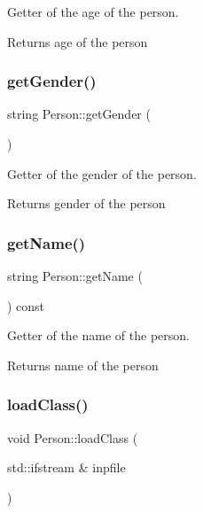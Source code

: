 Getter of the age of the person. 

\begin{DoxyReturn}{Returns}
age of the person 
\end{DoxyReturn}
\mbox{\label{class_person_a66e13299dd684b80e7f8a9303c751ad5}} 
\subsubsection{\texorpdfstring{get\+Gender()}{getGender()}}
{\footnotesize\ttfamily string Person\+::get\+Gender (\begin{DoxyParamCaption}{ }\end{DoxyParamCaption})}



Getter of the gender of the person. 

\begin{DoxyReturn}{Returns}
gender of the person 
\end{DoxyReturn}
\mbox{\label{class_person_a9db2e2ccfc6cfa0d7979613ec2aaa922}} 
\subsubsection{\texorpdfstring{get\+Name()}{getName()}}
{\footnotesize\ttfamily string Person\+::get\+Name (\begin{DoxyParamCaption}{ }\end{DoxyParamCaption}) const}



Getter of the name of the person. 

\begin{DoxyReturn}{Returns}
name of the person 
\end{DoxyReturn}
\mbox{\label{class_person_af07a032df8d56dddade4dc43960b536b}} 
\subsubsection{\texorpdfstring{load\+Class()}{loadClass()}}
{\footnotesize\ttfamily void Person\+::load\+Class (\begin{DoxyParamCaption}\item[{std\+::ifstream \&}]{inpfile }\end{DoxyParamCaption})\hspace{0.3cm}{\ttfamily [virtual]}}



